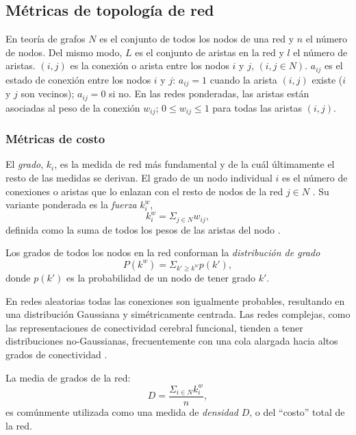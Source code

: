 \subsection{Métricas de topología de red}
En teoría de grafos $N$ es el conjunto de todos los nodos de una red y $n$ el número de nodos.
Del mismo modo, $L$ es el conjunto de aristas en la red y $l$ el número de aristas.
$(i,j)$ es la conexión o arista entre los nodos $i$ y $j$, $(i,j \in N)$.
$a_{ij}$ es el estado de conexión entre los nodos $i$ y $j$: $a_{ij} = 1$ cuando la arista $(i,j)$ existe ($i$ y $j$ son vecinos); $a_{ij} = 0$ si no.
En las redes ponderadas, las aristas están asociadas al peso de la conexión $w_{ij}$; $0 \leq w_{ij} \leq 1$ para todas las aristas $(i, j)$.

\subsubsection{Métricas de costo}
El \emph{grado}, $k_i$, es la medida de red más fundamental y de la cuál últimamente el resto de las medidas se derivan.
El grado de un nodo individual $i$ es el número de conexiones o aristas que lo enlazan con el resto de nodos de la red $j \in N$ \parencite{Bullmore2009a,Rubinov2010}.
Su variante ponderada es la \emph{fuerza} $k_i^w$,
\begin{equation}\label{eqStrength}
    k_i^w = \Sigma_{j \in N}w_{ij},
\end{equation}
definida como la suma de todos los pesos de las aristas del nodo \parencite{Rubinov2010}.\par
Los grados de todos los nodos en la red conforman la \emph{distribución de grado} \parencite{Rubinov2010}
\begin{equation}\label{eqDDist}
    P(k^w)=\Sigma_{k' \geq k^w}p(k'),
\end{equation}
donde $p(k')$ es la probabilidad de un nodo de tener grado $k'$.\par
En redes aleatorias todas las conexiones son igualmente probables, resultando en una distribución Gaussiana y simétricamente centrada.
Las redes complejas, como las representaciones de conectividad cerebral funcional, tienden a tener distribuciones no-Gaussianas, frecuentemente con una cola alargada hacia altos grados de conectividad \parencite{Bullmore2009a}. \par
La media de grados de la red:
\begin{equation}\label{eqDensity}
    D=\frac{\Sigma_{i \in N}k_i^w}{n},
\end{equation}
es comúnmente utilizada como una medida de \emph{densidad} $D$, o del ``costo'' total de la red.

